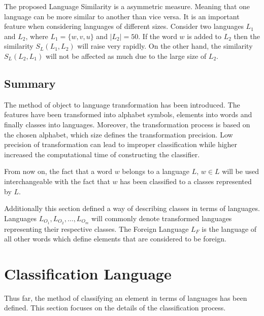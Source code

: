 \documentclass{mini}
\newcommand{\lanSim}[2]{
    S_{L}(#1,#2)
}
\begin{document}
The proposed Language Similarity is a asymmetric measure. Meaning that one language can be more similar to another than vice versa. It is an important feature when considering languages of different sizes. Consider two languages $L_{1}$ and $L_{2}$, where $L_{1} = \{w,v,u\}$ and $|L_{2}| = 50$.
If the word $w$ is added to $L_{2}$ then the similarity $\lanSim{L_1}{L_2}$ will raise very rapidly. On the other hand, the similarity $\lanSim{L_2}{L_1}$ will not be affected as much due to the large size of $L_{2}$.

\subsection{Summary}\label{sec:lan_theory_transf_summary}
The method of object to language transformation has been introduced. The features have been transformed into alphabet symbols, elements into words and finally classes into languages. Moreover, the transformation process is based on the chosen alphabet, which size defines the transformation precision. Low precision of transformation can lead to improper classification while higher increased the computational time of constructing the classifier.

From now on, the fact that a word $w$ belongs to a language $L$, $w\in L$ will be used interchangeable with the fact that $w$ has been classified to a classes represented by $L$.

Additionally this section defined a way of describing classes in terms of languages. Languages $L_{O_1},L_{O_2},\ldots,L_{O_m}$ will commonly denote transformed languages representing their respective classes. The Foreign Language $L_{F}$ is the language of all other words which define elements that are considered to be foreign.

\section{Classification Language}\label{sec:lan_theory_class_lan}
Thus far, the method of classifying an element in terms of languages has been defined. This section focuses on the details of the classification process.
\end{document}
